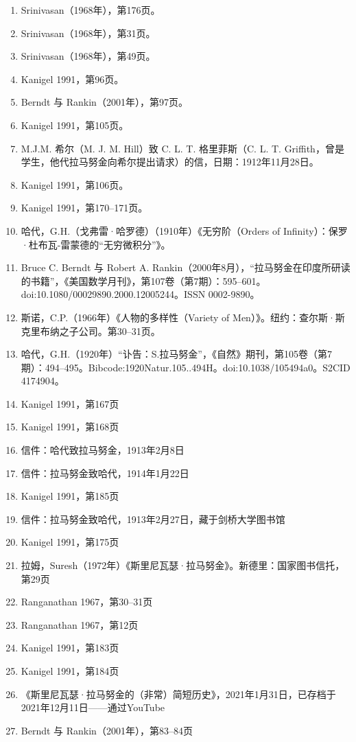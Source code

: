 \begin{enumerate}
\item Srinivasan（1968年），第176页。
\item Srinivasan（1968年），第31页。
\item Srinivasan（1968年），第49页。
\item Kanigel 1991，第96页。
\item Berndt 与 Rankin（2001年），第97页。
\item Kanigel 1991，第105页。
\item M.J.M. 希尔（M. J. M. Hill）致 C. L. T. 格里菲斯（C. L. T. Griffith，曾是学生，他代拉马努金向希尔提出请求）的信，日期：1912年11月28日。
\item Kanigel 1991，第106页。
\item Kanigel 1991，第170–171页。
\item 哈代，G.H.（戈弗雷·哈罗德）（1910年）《无穷阶（Orders of Infinity）：保罗·杜布瓦-雷蒙德的“无穷微积分”》。
\item Bruce C. Berndt 与 Robert A. Rankin（2000年8月），“拉马努金在印度所研读的书籍”，《美国数学月刊》，第107卷（第7期）：595–601。doi:10.1080/00029890.2000.12005244。ISSN 0002-9890。
\item 斯诺，C.P.（1966年）《人物的多样性（Variety of Men）》。纽约：查尔斯·斯克里布纳之子公司。第30–31页。
\item 哈代，G.H.（1920年）“讣告：S.拉马努金”，《自然》期刊，第105卷（第7期）：494–495。Bibcode:1920Natur.105..494H。doi:10.1038/105494a0。S2CID 4174904。
\item Kanigel 1991，第167页
\item Kanigel 1991，第168页
\item 信件：哈代致拉马努金，1913年2月8日
\item 信件：拉马努金致哈代，1914年1月22日
\item Kanigel 1991，第185页
\item 信件：拉马努金致哈代，1913年2月27日，藏于剑桥大学图书馆
\item Kanigel 1991，第175页
\item 拉姆，Suresh（1972年）《斯里尼瓦瑟·拉马努金》。新德里：国家图书信托，第29页
\item Ranganathan 1967，第30–31页
\item Ranganathan 1967，第12页
\item Kanigel 1991，第183页
\item Kanigel 1991，第184页
\item 《斯里尼瓦瑟·拉马努金的（非常）简短历史》，2021年1月31日，已存档于2021年12月11日——通过YouTube
\item Berndt 与 Rankin（2001年），第83–84页

\end{enumerate}
